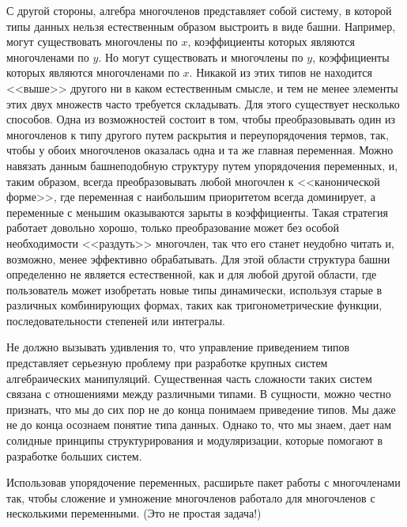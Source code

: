 С другой стороны, алгебра многочленов представляет собой
систему, в которой типы данных нельзя естественным образом выстроить в
виде башни.  Например, могут существовать многочлены по 
$x$, коэффициенты которых являются многочленами
по  $y$.  Но могут существовать и многочлены по
$y$, коэффициенты которых являются многочленами
по $x$.  Никакой из этих типов не находится
<<выше>> другого ни в каком естественным смысле, и тем не менее элементы
этих двух множеств часто требуется складывать.  Для этого существует несколько
способов.  Одна из возможностей состоит в том, чтобы
преобразовывать один из многочленов к типу другого путем раскрытия и
переупорядочения термов, так, чтобы у обоих многочленов оказалась одна и
та же главная переменная.  Можно навязать данным башнеподобную
структуру путем упорядочения переменных, и, таким образом, всегда
преобразовывать любой многочлен к 
<<канонической форме>>, где 
переменная с наибольшим приоритетом всегда доминирует, а переменные с
меньшим оказываются зарыты в коэффициенты.  Такая стратегия работает
довольно хорошо, только преобразование может без особой необходимости
<<раздуть>> многочлен, так что его станет неудобно читать и,
возможно, менее эффективно обрабатывать.  Для этой области структура
башни определенно не является естественной, как и для любой другой
области, где пользователь может изобретать новые типы динамически,
используя старые в различных комбинирующих формах, таких как
тригонометрические функции, последовательности степеней или
интегралы.

Не должно вызывать удивления то, что управление приведением типов представляет серьезную проблему при разработке крупных систем алгебраических манипуляций.  Существенная часть сложности таких систем связана с
отношениями между различными типами.  В сущности, можно честно
признать, что мы до сих пор не до конца понимаем приведение типов.  Мы
даже не до конца осознаем понятие типа данных.  Однако то, что мы
знаем, дает нам солидные принципы структурирования и модуляризации,
которые помогают в разработке больших систем.
\begin{exercise}{2.92}\label{EX2.92}%
Использовав упорядочение переменных, расширьте пакет работы с
многочленами так, чтобы сложение и умножение многочленов работало для
многочленов с несколькими переменными. (Это не простая задача!)
\end{exercise}

